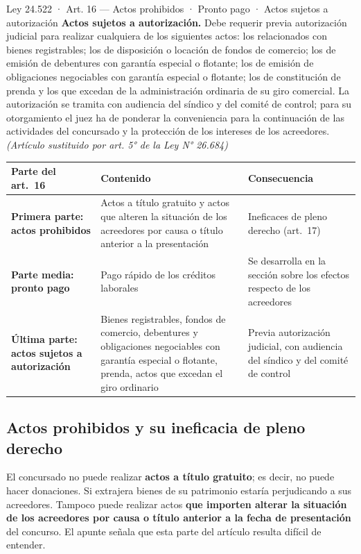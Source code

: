 \documentclass[12pt,oneside]{book}
\begin{document}
\begin{norma}{Ley 24.522 · Art. 16 — Actos prohibidos · Pronto pago · Actos sujetos a autorización}
\textbf{Actos sujetos a autorización.} Debe requerir previa autorización judicial para realizar cualquiera de los siguientes actos: los relacionados con bienes registrables; los de disposición o locación de fondos de comercio; los de emisión de debentures con garantía especial o flotante; los de emisión de obligaciones negociables con garantía especial o flotante; los de constitución de prenda y los que excedan de la administración ordinaria de su giro comercial. La autorización se tramita con audiencia del síndico y del comité de control; para su otorgamiento el juez ha de ponderar la conveniencia para la continuación de las actividades del concursado y la protección de los intereses de los acreedores. \textit{(Artículo sustituido por art. 5° de la Ley N° 26.684)}
\end{norma}

\begingroup
\small
\renewcommand{\arraystretch}{1.25}
\begin{tabularx}{\textwidth}{>{\raggedright\arraybackslash}p{} Y Y}
\toprule
\textbf{Parte del art.~16} & \textbf{Contenido} & \textbf{Consecuencia} \\
\midrule
\textbf{Primera parte: actos prohibidos} & Actos a título gratuito y actos que alteren la situación de los acreedores por causa o título anterior a la presentación & Ineficaces de pleno derecho (art.~17) \\
\textbf{Parte media: pronto pago} & Pago rápido de los créditos laborales & Se desarrolla en la sección sobre los efectos respecto de los acreedores \\
\textbf{Última parte: actos sujetos a autorización} & Bienes registrables, fondos de comercio, debentures y obligaciones negociables con garantía especial o flotante, prenda, actos que excedan el giro ordinario & Previa autorización judicial, con audiencia del síndico y del comité de control \\
\bottomrule
\end{tabularx}
\endgroup

\subsection{Actos prohibidos y su ineficacia de pleno derecho}

El concursado no puede realizar \textbf{actos a título gratuito}; es decir, no puede hacer donaciones. Si extrajera bienes de su patrimonio estaría perjudicando a sus acreedores. Tampoco puede realizar actos \textbf{que importen alterar la situación de los acreedores por causa o título anterior a la fecha de presentación} del concurso. El apunte señala que esta parte del artículo resulta difícil de entender.
\end{document}
